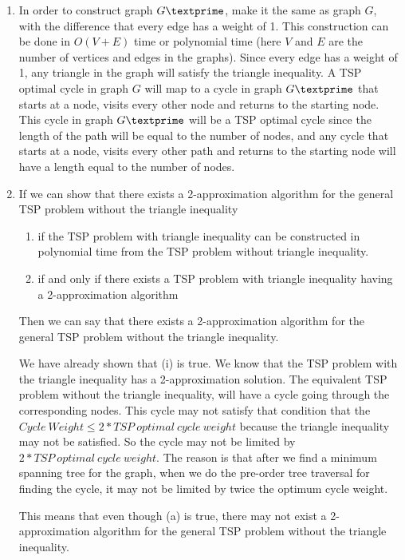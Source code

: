 \documentclass[paper=a4, fontsize=11pt]{scrartcl} %
\numberwithin{figure}{section} %
\numberwithin{table}{section} %
\begin{document}
\begin{enumerate}
\begin{enumerate}
\item In order to construct graph $G\textprime$, make it the same as graph $G$, with the difference that every edge has a weight of 1. This construction can be done in $O(V+E)$ time or polynomial time (here $V$ and $E$ are the number of vertices and edges in the graphs). Since every edge has a weight of 1, any triangle in the graph will satisfy the triangle inequality. A TSP optimal cycle in graph $G$ will map to a cycle in graph $G\textprime$ that starts at a node, visits every other node and returns to the starting node. This cycle in graph $G\textprime$ will be a TSP optimal cycle since the length of the path will be equal to the number of nodes, and any cycle that starts at a node, visits every other path and returns to the starting node will have a length equal to the number of nodes.

\item If we can show that there exists a 2-approximation algorithm for the general TSP problem without the triangle inequality 
\begin{enumerate}

\item if the TSP problem with triangle inequality can be constructed in polynomial time from the TSP problem without triangle inequality.

\item if and only if there exists a TSP problem with triangle inequality having a 2-approximation algorithm

\end{enumerate}

Then we can say that there exists a 2-approximation algorithm for the general TSP problem without the triangle inequality.

We have already shown that (i) is true. We know that the TSP problem with the triangle inequality has a 2-approximation solution. The equivalent TSP problem without the triangle inequality, will have a cycle going through the corresponding nodes. This cycle may not satisfy that condition that the $Cycle \: Weight \leq 2 * TSP \: optimal \: cycle \: weight$ because the triangle inequality may not be satisfied. So the cycle may not be limited by $2 * TSP \: optimal \: cycle \: weight$. The reason is that after we find a minimum spanning tree for the graph, when we do the pre-order tree traversal for finding the cycle, it may not be limited by twice the optimum cycle weight.

This means that even though (a) is true, there may not exist a 2-approximation algorithm for the general TSP problem without the triangle inequality.
\end{enumerate}

\end{enumerate}

\end{document}

